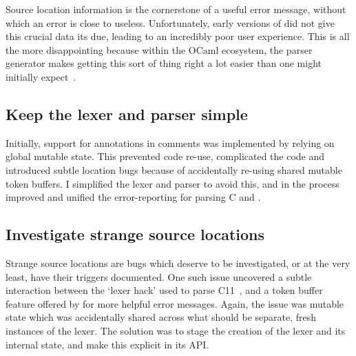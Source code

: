 
Source location information is the cornerstone of a useful error
message, without which an error is close to useless. Unfortunately, early
versions of  did not give this crucial data its due, leading to an
incredibly poor user experience. This is all the more disappointing because
within the OCaml ecosystem, the  parser generator makes getting this
sort of thing right a lot easier than one might initially
expect~.

\subsection{Keep the lexer and parser simple}

Initially, support for 
annotations in comments was implemented by relying on global
mutable state.
This prevented code re-use, complicated the code and introduced subtle
location bugs because of accidentally re-using shared mutable token
buffers. I simplified the lexer and parser to avoid this, and in the
process improved and unified the error-reporting for parsing C and
.

\subsection{Investigate strange source locations}

Strange source locations are
bugs which deserve to be investigated, or at the very least, have their
triggers documented. One such
issue
uncovered a subtle interaction between the `lexer hack' used to parse
C11~, and a token buffer feature offered by
 for more helpful error messages. Again, the issue was mutable state
which was accidentally shared across what should be separate, fresh instances
of the lexer. The solution was to stage the creation of the lexer and its
internal state, and make this explicit in its
API.

